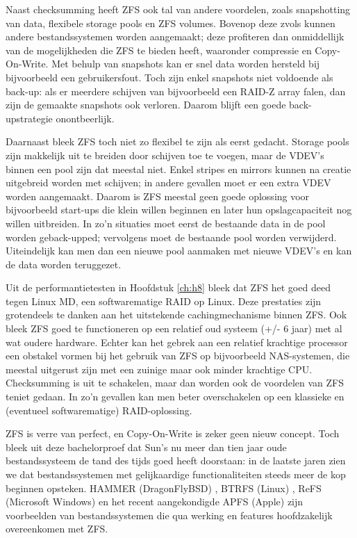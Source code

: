 Naast checksumming heeft ZFS ook tal van andere voordelen, zoals snapshotting van data, flexibele storage pools en ZFS volumes. Bovenop deze zvols kunnen andere bestandssystemen worden aangemaakt; deze profiteren dan onmiddellijk van de mogelijkheden die ZFS te bieden heeft, waaronder compressie en Copy-On-Write. Met behulp van snapshots kan er snel data worden hersteld bij bijvoorbeeld een gebruikersfout. Toch zijn enkel snapshots niet voldoende als back-up: als er meerdere schijven van bijvoorbeeld een RAID-Z array falen, dan zijn de gemaakte snapshots ook verloren. Daarom blijft een goede back-upstrategie onontbeerlijk.

Daarnaast bleek ZFS toch niet zo flexibel te zijn als eerst gedacht. Storage pools zijn makkelijk uit te breiden door schijven toe te voegen, maar de VDEV's binnen een pool zijn dat meestal niet. Enkel stripes en mirrors kunnen na creatie uitgebreid worden met schijven; in andere gevallen moet er een extra VDEV worden aangemaakt. Daarom is ZFS meestal geen goede oplossing voor bijvoorbeeld start-ups die klein willen beginnen en later hun opslagcapaciteit nog willen uitbreiden. In zo'n situaties moet eerst de bestaande data in de pool worden geback-upped; vervolgens moet de bestaande pool worden verwijderd. Uiteindelijk kan men dan een nieuwe pool aanmaken met nieuwe VDEV's en kan de data worden teruggezet.

Uit de performantietesten in Hoofdstuk \ref{ch:h8} bleek dat ZFS het goed deed tegen Linux MD, een softwarematige RAID op Linux. Deze prestaties zijn grotendeels te danken aan het uitstekende cachingmechanisme binnen ZFS. Ook bleek ZFS goed te functioneren op een relatief oud systeem (+/- 6 jaar) met al wat oudere hardware. Echter kan het gebrek aan een relatief krachtige processor een obstakel vormen bij het gebruik van ZFS op bijvoorbeeld NAS-systemen, die meestal uitgerust zijn met een zuinige maar ook minder krachtige CPU. Checksumming is uit te schakelen, maar dan worden ook de voordelen van ZFS teniet gedaan. In zo'n gevallen kan men beter overschakelen op een klassieke en (eventueel softwarematige) RAID-oplossing.

ZFS is verre van perfect, en Copy-On-Write is zeker geen nieuw concept. Toch bleek uit deze bachelorproef dat Sun's nu meer dan tien jaar oude bestandssysteem de tand des tijds goed heeft doorstaan: in de laatste jaren zien we dat bestandssystemen met gelijkaardige functionaliteiten steeds meer de kop beginnen opsteken. HAMMER (DragonFlyBSD) \autocite{DragonFlyBSD2017}, BTRFS (Linux) \autocite{BTRFSProject2017}, ReFS (Microsoft Windows) \autocite{Microsoft2016} en het recent aangekondigde APFS (Apple) \autocite{Apple2017} zijn voorbeelden van bestandssystemen die qua werking en features hoofdzakelijk overeenkomen met ZFS.


